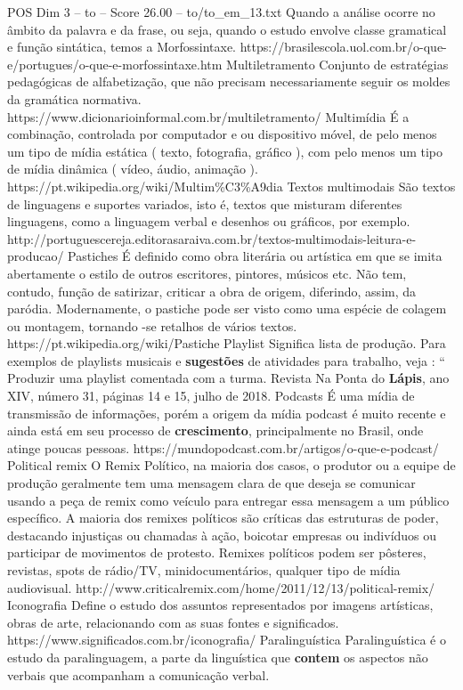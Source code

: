 \begin{textsample}{POS Dim 3 – to – Score 26.00 – to/to\_em\_13.txt}
Quando a análise ocorre no âmbito da palavra e da frase, ou seja, quando o estudo envolve classe gramatical e função sintática, temos a Morfossintaxe. https://brasilescola.uol.com.br/o-que-e/portugues/o-que-e-morfossintaxe.htm Multiletramento Conjunto de estratégias pedagógicas de alfabetização, que não precisam necessariamente seguir os moldes da gramática normativa. https://www.dicionarioinformal.com.br/multiletramento/ Multimídia É a combinação, controlada por computador e ou dispositivo móvel, de pelo menos um tipo de mídia estática ( texto, fotografia, gráfico ), com pelo menos um tipo de mídia dinâmica ( vídeo, áudio, animação ). https://pt.wikipedia.org/wiki/Multim\%C3\%A9dia Textos multimodais São textos de linguagens e suportes variados, isto é, textos que misturam diferentes linguagens, como a linguagem verbal e desenhos ou gráficos, por exemplo. http://portuguescereja.editorasaraiva.com.br/textos-multimodais-leitura-e-producao/ Pastiches É definido como obra literária ou artística em que se imita abertamente o estilo de outros escritores, pintores, músicos etc.
Não tem, contudo, função de satirizar, criticar a obra de origem, diferindo, assim, da paródia.
Modernamente, o pastiche pode ser visto como uma espécie de colagem ou montagem, tornando -se retalhos de vários textos. https://pt.wikipedia.org/wiki/Pastiche Playlist Significa lista de produção.
Para exemplos de playlists musicais e \textbf{sugestões} de atividades para trabalho, veja : “ Produzir uma playlist comentada com a turma.
Revista Na Ponta do \textbf{Lápis}, ano XIV, número 31, páginas 14 e 15, julho de 2018.
Podcasts É uma mídia de transmissão de informações, porém a origem da mídia podcast é muito recente e ainda está em seu processo de \textbf{crescimento}, principalmente no Brasil, onde atinge poucas pessoas. https://mundopodcast.com.br/artigos/o-que-e-podcast/ Political remix O Remix Político, na maioria dos casos, o produtor ou a equipe de produção geralmente tem uma mensagem clara de que deseja se comunicar usando a peça de remix como veículo para entregar essa mensagem a um público específico.
A maioria dos remixes políticos são críticas das estruturas de poder, destacando injustiças ou chamadas à ação, boicotar empresas ou indivíduos ou participar de movimentos de protesto.
Remixes políticos podem ser pôsteres, revistas, spots de rádio/TV, minidocumentários, qualquer tipo de mídia audiovisual. http://www.criticalremix.com/home/2011/12/13/political-remix/ Iconografia Define o estudo dos assuntos representados por imagens artísticas, obras de arte, relacionando com as suas fontes e significados. https://www.significados.com.br/iconografia/ Paralinguística Paralinguística é o estudo da paralinguagem, a parte da linguística que \textbf{contem} os aspectos não verbais que acompanham a comunicação verbal.

\end{textsample}
